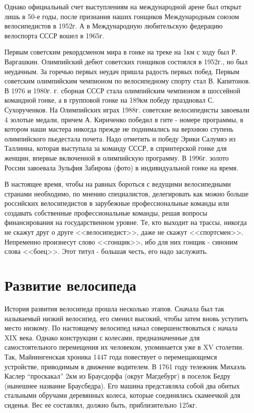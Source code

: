 \documentclass[a4paper,14pt]{extreport}
\begin{document}
Однако официальный счет выступлениям на международной арене был открыт лишь в 50-е годы, после признания наших гонщиков Международным союзом велосипедистов в 1952г. А в Международную любительскую федерацию велоспорта СССР вошел в 1965г. 

Первым советским рекордсменом мира в гонке на треке на 1км с ходу был Р. Варгашкин. Олимпийский дебют советских гонщиков состоялся в 1952г., но был неудачным. За горечью первых неудач пришла радость первых побед. Первым советским олимпийским чемпионом по велосипедному спорту стал В. Капитонов. В 1976 и 1980г. г. сборная СССР стала олимпийским чемпионом в шоссейной командной гонке, а в групповой гонке на 189км победу праздновал С. Сухорученков. На Олимпийских играх 1988г. советские велосипедисты завоевали 4 золотые медали, причем А. Кириченко победил в гите - номере программы, в котором наши мастера никогда прежде не поднимались на верхнюю ступень олимпийского пьедестала почета. Надо отметить и победу Эрики Салумяэ из Таллинна, которая выступала за команду СССР, в спринтерской гонке для женщин, впервые включенной в олимпийскую программу. В 1996г. золото России завоевала Зульфия Забирова (фото) в индивидуальной гонке на время.

В настоящее время, чтобы на равных бороться с ведущими велосипедными странами необходимо, по мнению специалистов, делегировать как можно больше российских велосипедистов в зарубежные профессиональные команды или создавать собственные профессиональные команды, решая вопросы финансирования на государственном уровне. Те, кто выходит на трассы, никогда не скажут друг о друге <<велосипедист>>, даже не скажут <<спортсмен>>. Непременно произнесут слово <<гонщик>>, ибо для них гонщик - синоним слова <<боец>>. Этот титул - большая честь, его надо заслужить.

\chapter{Развитие велосипеда}

История развития велосипеда прошла несколько этапов. Сначала был так называемый низкий велосипед, его сменил высокий, чтобы затем вновь уступить место низкому. По настоящему велосипед начал совершенствоваться с начала XIX века. Однако конструкции с колесами, предназначенные для самостоятельного перемещения их человеком, упоминается уже в XV столетии. Так, Майнингенская хроника 1447 года повествует о перемещающемся устройстве, приводимым в движение водителем.
В 1761 году тележник Михаэль Каслер “проскакал” 2км из Браусдорфа (округ Магдебург) в поселок Бедру (нынешнее название Браусбедра). Его машина представляла собой два обитых стальными обручами деревянных колеса, которые соединялись скамеечкой для сиденья. Вес ее составлял, должно быть, приблизительно 125кг.
\end{document}
